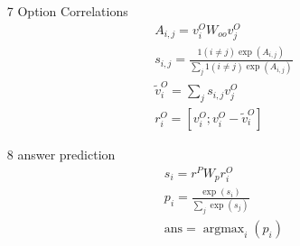 \documentclass[a4paper,UTF8]{article}
\numberwithin{equation}{section}
\begin{document}
\begin{enumerate}
\begin{equation}
	\end{equation}
	\item[7] Option Correlations
	\begin{equation}
	\begin{array}{c}{A_{i, j}=v_{i}^{O} W_{o o} v_{j}^{O}} \\ {s_{i, j}=\frac{1(i \neq j) \exp \left(A_{i, j}\right)}{\sum_{j} 1(i \neq j) \exp \left(A_{i, j}\right)}} \\ {\tilde{v}_{i}^{O}=\sum_{j} s_{i, j} v_{j}^{O}} \\ {r_{i}^{O}=\left[v_{i}^{O} ; v_{i}^{O}-\tilde{v}_{i}^{O}\right]}\end{array}
	\end{equation}
	\item[8] answer prediction
	\begin{equation}
	\begin{array}{c}{s_{i}=r^{P} W_{p} r_{i}^{O}} \\ {p_{i}=\frac{\exp \left(s_{i}\right)}{\sum_{j} \exp \left(s_{j}\right)}} \\ {\text {ans}=\operatorname{argmax}_{i}\left(p_{i}\right)}\end{array}
	\end{equation}
\end{enumerate}


\newpage
\end{document}
